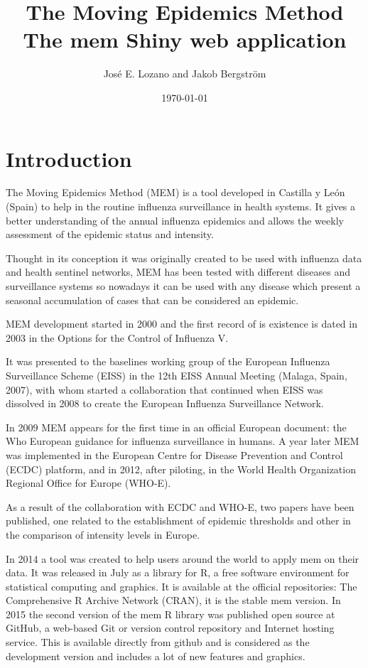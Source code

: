 \documentclass[10pt,a4paper]{memoir}
\title{%
  The Moving Epidemics Method \\
  \large The mem Shiny web application}
\author{José E. Lozano and  Jakob Bergström}
\date{\today}
\begin{document}

\maketitle
\newpage
\tableofcontents
\newpage
{}

\chapter{Introduction}

The Moving Epidemics Method (MEM) is a tool developed in Castilla y León (Spain) to help in the routine influenza surveillance in health systems. It gives a better understanding of the annual influenza epidemics and allows the weekly assessment of the epidemic status and intensity.

Thought in its conception it was originally created to be used with influenza data and health sentinel networks, MEM has been tested with different diseases and surveillance systems so nowadays it can be used with any disease which present a seasonal accumulation of cases that can be considered an epidemic.

MEM development started in 2000 and the first record of is existence is dated in 2003 in the Options for the Control of Influenza V\citep{vega_alonso_modelling_2004}.

It was presented to the baselines working group of the European Influenza Surveillance Scheme (EISS) in the 12th EISS Annual Meeting (Malaga, Spain, 2007), with whom started a collaboration that continued when EISS was dissolved in 2008 to create the European Influenza Surveillance Network.

In 2009 MEM appears for the first time in an official European document: the Who European guidance for influenza surveillance in humans. A year later MEM was implemented in the European Centre for Disease Prevention and Control (ECDC) platform, and in 2012, after piloting, in the World Health Organization Regional Office for Europe (WHO-E).

As a result of the collaboration with ECDC and WHO-E, two papers have been published, one related to the establishment of epidemic thresholds\citep{vega_influenza_2013} and other in the comparison of intensity levels in Europe\citep{vega_influenza_2015}.

In 2014 a tool was created to help users around the world to apply mem on their data. It was released in July as a library for R, a free software environment for statistical computing and graphics. It is available at the official repositories: The Comprehensive R Archive Network (CRAN), it is the stable mem version\citep{jose_e_lozano_alonso_mem_nodate}.
In 2015 the second version of the mem R library was published open source at GitHub, a web-based Git or version control repository and Internet hosting service. This is available directly from github\citep{lozano_jose_e_lozalojo/mem:_nodate} and is considered as the development version and includes a lot of new features and graphics.
\end{document}

